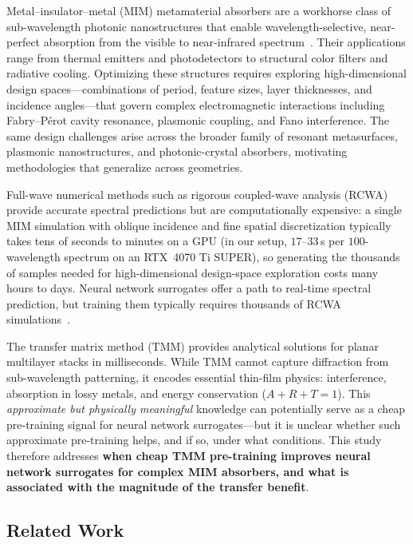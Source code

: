 \documentclass[a4paper,fleqn]{cas-sc}
\begin{document}
Metal--insulator--metal (MIM) metamaterial absorbers are a workhorse class of sub-wavelength photonic nanostructures that enable wavelength-selective, near-perfect absorption from the visible to near-infrared spectrum~\cite{landy2008perfect}. Their applications range from thermal emitters and photodetectors to structural color filters and radiative cooling. Optimizing these structures requires exploring high-dimensional design spaces---combinations of period, feature sizes, layer thicknesses, and incidence angles---that govern complex electromagnetic interactions including Fabry--P\'{e}rot cavity resonance, plasmonic coupling, and Fano interference. The same design challenges arise across the broader family of resonant metasurfaces, plasmonic nanostructures, and photonic-crystal absorbers, motivating methodologies that generalize across geometries.

Full-wave numerical methods such as rigorous coupled-wave analysis (RCWA) provide accurate spectral predictions but are computationally expensive: a single MIM simulation with oblique incidence and fine spatial discretization typically takes tens of seconds to minutes on a GPU (in our setup, $17$--$33$\,s per $100$-wavelength spectrum on an RTX~4070 Ti SUPER), so generating the thousands of samples needed for high-dimensional design-space exploration costs many hours to days. Neural network surrogates offer a path to real-time spectral prediction, but training them typically requires thousands of RCWA simulations~\cite{so2020deep,liu2018training}.

The transfer matrix method (TMM) provides analytical solutions for planar multilayer stacks in milliseconds. While TMM cannot capture diffraction from sub-wavelength patterning, it encodes essential thin-film physics: interference, absorption in lossy metals, and energy conservation ($A+R+T=1$). This \emph{approximate but physically meaningful} knowledge can potentially serve as a cheap pre-training signal for neural network surrogates---but it is unclear whether such approximate pre-training helps, and if so, under what conditions. This study therefore addresses \textbf{when cheap TMM pre-training improves neural network surrogates for complex MIM absorbers, and what is associated with the magnitude of the transfer benefit}.

\subsection{Related Work}
\end{document}
